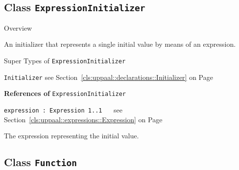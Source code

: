 \subsection{Class \bfseries \texttt{ExpressionInitializer}\normalfont}
\label{cls:uppaal::declarations::ExpressionInitializer} 
	
	\begin{longdescription}
		\item[Overview] 		
				

	

		An initializer that represents a single initial value by means of an expression.		
		\item[Super Types of \texttt{ExpressionInitializer}] ~
			\begin{longdescription}
				\item[\texttt{Initializer}] see Section~\ref{cls:uppaal::declarations::Initializer} on Page~\pageref{cls:uppaal::declarations::Initializer}						\end{longdescription}
		
	
			\item[\textbf{References of} \texttt{ExpressionInitializer}] ~
			\begin{longdescription}
	\item[\texttt{expression : Expression 	\symbol{"5B}1..1\symbol{"5D}
}] ~
	see Section~\ref{cls:uppaal::expressions::Expression} on Page~\pageref{cls:uppaal::expressions::Expression}
	
	\nopagebreak
		
				

	

		The expression representing the initial value.		
			\end{longdescription}
	
	\end{longdescription}
	

\subsection{Class \bfseries \texttt{Function}\normalfont}
\label{cls:uppaal::declarations::Function} 
	
